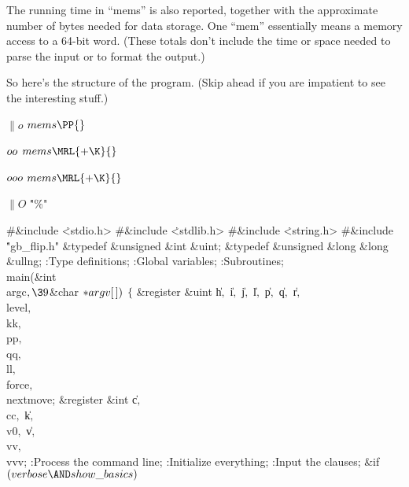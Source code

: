 The running time in ``mems'' is also reported, together with the approximate
number of bytes needed for data storage. One ``mem'' essentially means a
memory access to a 64-bit word.
(These totals don't include the time or space needed to parse the
input or to format the output.)

\fi

So here's the structure of the program. (Skip ahead if you are
impatient to see the interesting stuff.)

\Y\B\4\D$\|o$ \5
$\\{mems}\PP{}$\par
\B\4\D$\\{oo}$ \5
$\\{mems}\MRL{+{\K}}{}$\par
\B\4\D$\\{ooo}$ \5
$\\{mems}\MRL{+{\K}}{}$\par
\B\4\D$\|O$ \5
\.{"\%"}\par
\Y\B\8\#\&{include} \.{<stdio.h>}\6
\8\#\&{include} \.{<stdlib.h>}\6
\8\#\&{include} \.{<string.h>}\6
\8\#\&{include} \.{"gb\_flip.h"}\6
\&{typedef} \&{unsigned} \&{int} \&{uint};\6
\&{typedef} \&{unsigned} \&{long} \&{long} \&{ullng};\7
:Type definitions\X;\6
:Global variables\X;\6
:Subroutines\X;\7
\\{main}(\&{int} \\{argc}${},\39{}$\&{char} ${}{*}\\{argv}[\,]){}$\1\1\2\2\6
${}\{{}$\1\6
\&{register} \&{uint} \|h${},{}$ \|i${},{}$ \|j${},{}$ \|l${},{}$ \|p${},{}$ %
\|q${},{}$ \|r${},{}$ \\{level}${},{}$ \\{kk}${},{}$ \\{pp}${},{}$ %
\\{qq}${},{}$ \\{ll}${},{}$ \\{force}${},{}$ \\{nextmove};\6
\&{register} \&{int} \|c${},{}$ \\{cc}${},{}$ \|k${},{}$ \\{v0}${},{}$ %
\|v${},{}$ \\{vv}${},{}$ \\{vvv};\7
:Process the command line\X;\6
:Initialize everything\X;\6
:Input the clauses\X;\6
\&{if} ${}(\\{verbose}\AND\\{show\_basics}){}$\1\5
